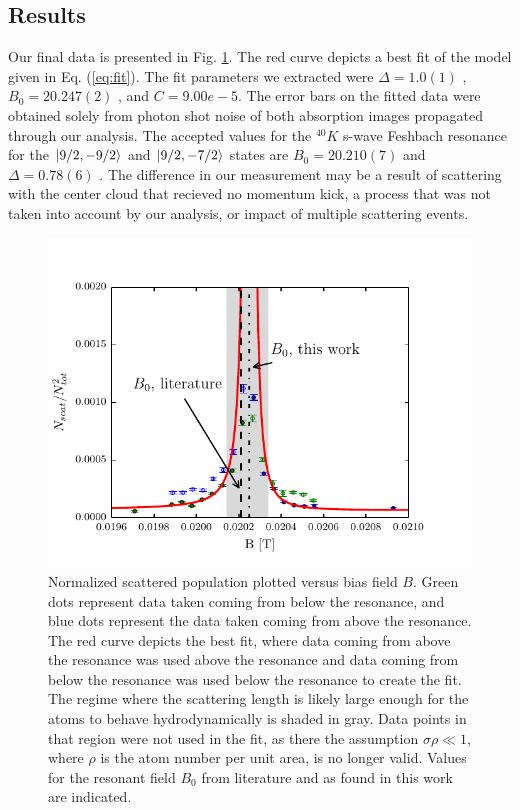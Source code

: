 \documentclass[12pt]{iopart}
\begin{document}
\subsection{Results}
Our final data is presented in Fig. \ref{fig:fittedFractions}. The red curve depicts a best fit of the model given in Eq. (\ref{eq:fit}). The fit parameters we extracted were $\Delta = 1.0(1)$  \mT{}, $B_0 = 20.247(2)$  \mT{}, and $C=9.00e-5$. The error bars on the fitted data were obtained solely from photon shot noise of both absorption images propagated through our analysis.
The accepted values for the $^{40}K$ s-wave Feshbach resonance for the  $\mathinner{|{9/2,-9/2}\rangle}$ and $\mathinner{|{9/2,-7/2}\rangle}$ states are $B_0=20.210(7)$  \mT{} and $\Delta=0.78(6)$  \mT{}. The difference in our measurement may be a result of scattering with the center cloud that recieved no momentum kick, a process that was not taken into account by our analysis, or impact of multiple scattering events. 
\begin{figure}
	\includegraphics{figure11.pdf}
\caption{Normalized scattered population plotted versus bias field $B$. Green dots represent data taken coming from below the resonance, and blue dots represent the data taken coming from above the resonance. The red curve depicts the best fit, where data coming from above the resonance was used above the resonance and data coming from below the resonance was used below the resonance to create the fit. The regime where the scattering length is likely large enough for the atoms to behave hydrodynamically is shaded in gray. Data points in that region were not used in the fit, as there the assumption $\sigma\rho\ll1$, where $\rho$ is the atom number per unit area, is no longer valid. Values for the resonant field $B_0$ from literature and as found in this work are indicated.    }  
\label{fig:fittedFractions}
\end{figure}
\end{document}
